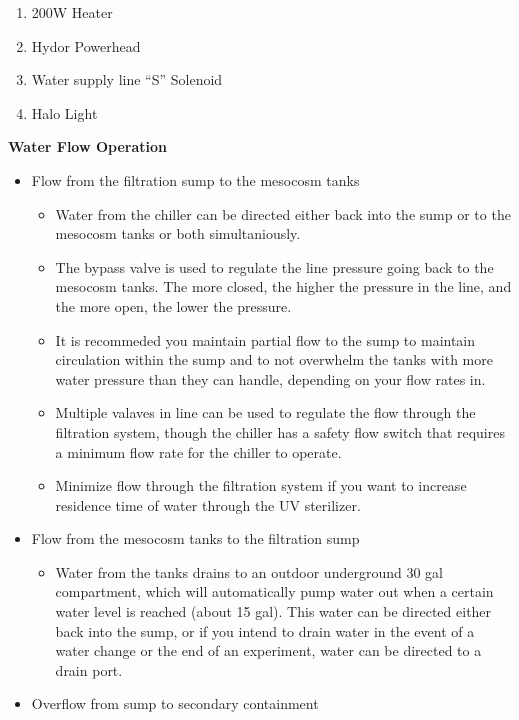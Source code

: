 \documentclass[
]{book}
\providecommand{\tightlist}{%
  \setlength{\itemsep}{0pt}\setlength{\parskip}{0pt}}
\begin{document}
\begin{enumerate}
\def\labelenumi{\arabic{enumi}.}
\tightlist
\item
  200W Heater
\item
  Hydor Powerhead
\item
  Water supply line ``S'' Solenoid
\item
  Halo Light
\end{enumerate}

\textbf{Water Flow Operation}

\begin{itemize}
\tightlist
\item
  Flow from the filtration sump to the mesocosm tanks

  \begin{itemize}
  \tightlist
  \item
    Water from the chiller can be directed either back into the sump or to the mesocosm tanks or both simultaniously.\\
  \item
    The bypass valve is used to regulate the line pressure going back to the mesocosm tanks. The more closed, the higher the pressure in the line, and the more open, the lower the pressure.\\
  \item
    It is recommeded you maintain partial flow to the sump to maintain circulation within the sump and to not overwhelm the tanks with more water pressure than they can handle, depending on your flow rates in.\\
  \item
    Multiple valaves in line can be used to regulate the flow through the filtration system, though the chiller has a safety flow switch that requires a minimum flow rate for the chiller to operate.\\
  \item
    Minimize flow through the filtration system if you want to increase residence time of water through the UV sterilizer.\\
  \end{itemize}
\item
  Flow from the mesocosm tanks to the filtration sump

  \begin{itemize}
  \tightlist
  \item
    Water from the tanks drains to an outdoor underground 30 gal compartment, which will automatically pump water out when a certain water level is reached (about 15 gal). This water can be directed either back into the sump, or if you intend to drain water in the event of a water change or the end of an experiment, water can be directed to a drain port.
  \end{itemize}
\item
  Overflow from sump to secondary containment


\end{itemize}
\end{document}
